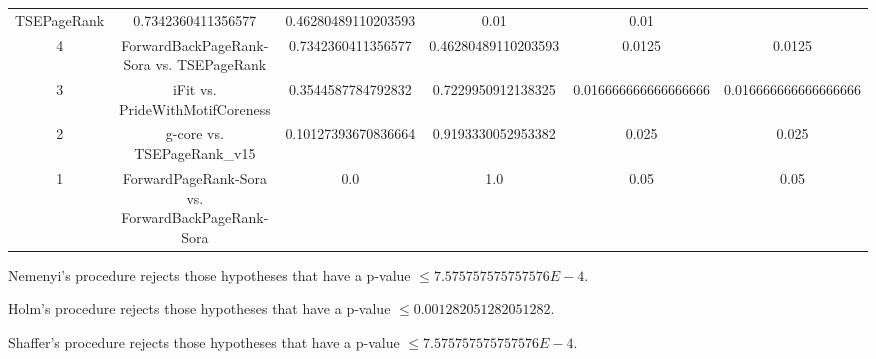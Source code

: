 \documentclass[a4paper,10pt]{article}
\begin{document}
\begin{landscape}
\begin{table}[!htp]
\begin{tabular}{cccccc}
TSEPageRank&0.7342360411356577&0.46280489110203593&0.01&0.01\\4&ForwardBackPageRank-Sora vs. TSEPageRank&0.7342360411356577&0.46280489110203593&0.0125&0.0125\\3&iFit vs. PrideWithMotifCoreness&0.3544587784792832&0.7229950912138325&0.016666666666666666&0.016666666666666666\\2&g-core vs. TSEPageRank_v15&0.10127393670836664&0.9193330052953382&0.025&0.025\\1&ForwardPageRank-Sora vs. ForwardBackPageRank-Sora&0.0&1.0&0.05&0.05\\\hline
\end{tabular}
\end{table}
Nemenyi's procedure rejects those hypotheses that have a p-value $\le7.575757575757576E-4$.


Holm's procedure rejects those hypotheses that have a p-value $\le0.001282051282051282$.


Shaffer's procedure rejects those hypotheses that have a p-value $\le7.575757575757576E-4$.



\end{landscape}
\end{document}
